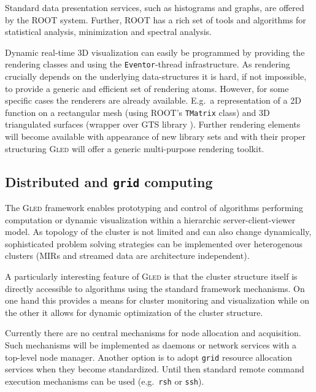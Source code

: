 \documentclass[final]{siamltex}
\def\gled{\textsc{Gled}\xspace}
\def\grid{\texttt{grid}\xspace}
\def\smalltt#1{{\small\texttt{#1}}}
\begin{document}
Standard data presentation services, such as histograms and graphs,
are offered by the ROOT system. Further, ROOT has a rich set of tools
and algorithms for statistical analysis, minimization and spectral
analysis.

Dynamic real-time 3D visualization can easily be programmed by
providing the rendering classes and using the \smalltt{Eventor}-thread
infrastructure. As rendering crucially depends on the underlying
data-structures it is hard, if not impossible, to provide a generic
and efficient set of rendering atoms. However, for some specific cases
the renderers are already available. E.g.\ a representation of a 2D
function on a rectangular mesh (using ROOT's \smalltt{TMatrix} class)
and 3D triangulated surfaces (wrapper over GTS library \cite{gts}).
Further rendering elements will become available with appearance of
new library sets and with their proper structuring \gled will offer a
generic multi-purpose rendering toolkit.

\subsection{Distributed and \grid computing}

The \gled framework enables prototyping and control of algorithms
performing computation or dynamic visualization within a hierarchic
server-client-viewer model. As topology of the cluster is not limited
and can also change dynamically, sophisticated problem solving
strategies can be implemented over heterogenous clusters (MIRs and
streamed data are architecture independent).

A particularly interesting feature of \gled is that the cluster
structure itself is directly accessible to algorithms using the
standard framework mechanisms. On one hand this provides a means for
cluster monitoring and visualization while on the other it allows for
dynamic optimization of the cluster structure.

Currently there are no central mechanisms for node allocation and
acquisition. Such mechanisms will be implemented as daemons or network
services with a top-level node manager. Another option is to adopt \grid
resource allocation services when they become standardized. Until then
standard remote command execution mechanisms can be used (e.g.\ 
\smalltt{rsh} or \smalltt{ssh}).
\end{document}
